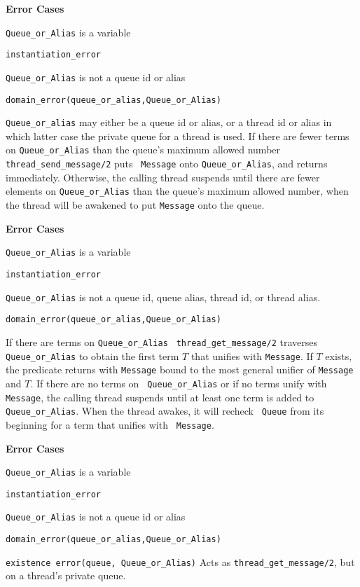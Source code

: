 \begin{description}
{\bf Error Cases}
\bi
\item 	{\tt Queue\_or\_Alias} is a variable
\bi
\item 	{\tt instantiation\_error}
\ei
%
\item 	{\tt Queue\_or\_Alias} is not a queue id or alias
\bi
\item 	{\tt domain\_error(queue\_or\_alias,Queue\_or\_Alias)}
\ei
\ei
%


%
{\tt Queue\_or\_alias} may either be a queue id or alias, or a thread
id or alias in which latter case the private queue for a thread is
used.  If there are fewer terms on {\tt Queue\_or\_Alias} than the
queue's maximum allowed number {\tt thread\_send\_message/2} puts {\tt
  Message} onto {\tt Queue\_or\_Alias}, and returns immediately.
Otherwise, the calling thread suspends until there are fewer elements
on {\tt Queue\_or\_Alias} than the queue's maximum allowed number,
when the thread will be awakened to put {\tt Message} onto the queue.

{\bf Error Cases}
\bi
\item 	{\tt Queue\_or\_Alias} is a variable
\bi
\item 	{\tt instantiation\_error}
\ei
%
\item {\tt Queue\_or\_Alias} is not a queue id, queue alias, thread
  id, or thread alias.  
\bi
\item 	{\tt domain\_error(queue\_or\_alias,Queue\_or\_Alias)}
\ei
\ei
%

%
If there are terms on {\tt Queue\_or\_Alias} {\tt
  thread\_get\_message/2} traverses {\tt Queue\_or\_Alias} to obtain
the first term $T$ that unifies with {\tt Message}.  If $T$ exists,
the predicate returns with {\tt Message} bound to the most general
unifier of {\tt Message} and $T$.  If there are no terms on {\tt
  Queue\_or\_Alias} or if no terms unify with {\tt Message}, the
calling thread suspends until at least one term is added to {\tt
  Queue\_or\_Alias}.  When the thread awakes, it will recheck {\tt
  Queue} from its beginning for a term that unifies with {\tt
  Message}.

{\bf Error Cases}
\bi
\item 	{\tt Queue\_or\_Alias} is a variable
\bi
\item 	{\tt instantiation\_error}
\ei
%
\item 	{\tt Queue\_or\_Alias} is not a queue id or alias
\bi
\item 	{\tt domain\_error(queue\_or\_alias,Queue\_or\_Alias)}
\ei
\bi
\item   {\tt existence error(queue, Queue\_or\_Alias)}
\ei
\ei
%
%
Acts as {\tt thread\_get\_message/2}, but on a thread's private queue.


\end{description}
